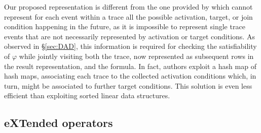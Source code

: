 
Our proposed representation is different from the one provided by \cite{BurattinMS16} which cannot represent for each event within a trace all the possible activation, target, or join condition happening in the future, as it is impossible to represent single trace events that are not necessarily represented by activation or target conditions. As observed in \S\ref{sec:DAD}, this information is required for checking the satisfiability of $\varphi$ while jointly visiting both the trace, now represented as subsequent rows in the result representation, and the formula. %
In fact, authors exploit
a hash map of hash maps, associating  each trace to the collected activation conditions which, in turn, might be associated to further target conditions. 
This solution is even less efficient than exploiting sorted linear data structures.
%


\subsection{eXTended \LTLf operators}\label{sec:xltlf}


